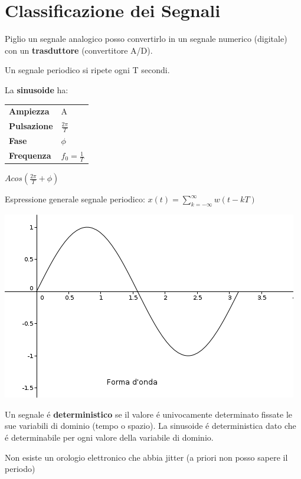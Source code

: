 \chapter{Classificazione dei Segnali}
Piglio un segnale analogico posso convertirlo in un segnale numerico (digitale) con un \textbf{trasduttore} (convertitore A/D).

Un segnale periodico si ripete ogni T secondi.
  
\begin{center}
  La \textbf{sinusoide} ha:
  \begin{tabular}{ll}
    \textbf{Ampiezza} & A \\
    \textbf{Pulsazione} & $\frac{2\pi}{T}$ \\
    \textbf{Fase} & $\phi$\\
    \textbf{Frequenza} & $f_0 = \frac{1}{T} $\\
  \end{tabular}

  $Acos(\frac{2\pi }{T} + \phi )$
\end{center}

Espressione generale segnale periodico: $x(t) = \sum ^\infty _{k = -\infty} w(t-kT)$
\begin{center}
  \includegraphics[scale=0.5]{Chapters/Img/c01_01.png}
\end{center}

Un segnale \'e \textbf{deterministico} se il valore \'e univocamente determinato fissate le sue variabili di dominio (tempo o spazio).
La sinusoide \'e deterministica dato che \'e determinabile per ogni valore della variabile di dominio.

Non esiste un orologio elettronico che abbia jitter (a priori non posso sapere il periodo)

